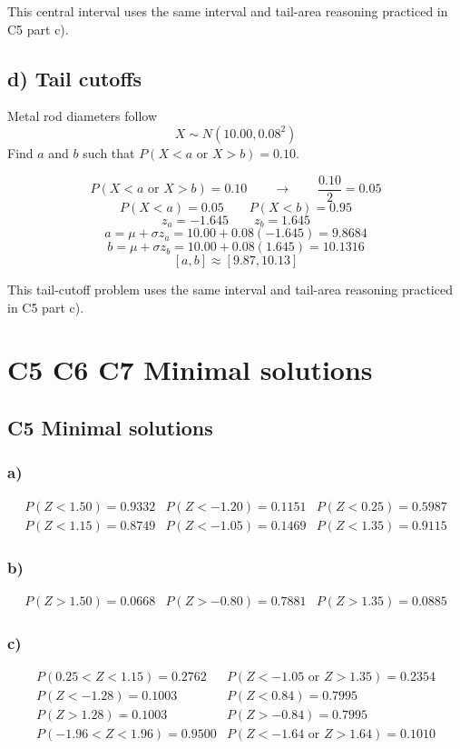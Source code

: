 This central interval uses the same interval and tail-area reasoning practiced in C5 part c).


\subsection*{d) Tail cutoffs}
\label{subsec:inverse-normal-problems-c7-d}
Metal rod diameters follow
\[
X\sim N(10.00,0.08^2)
\]
Find \(a\) and \(b\) such that \(P(X<a\text{ or }X>b)=0.10\).

\[
P(X<a\text{ or }X>b)=0.10
\qquad \longrightarrow \qquad
\frac{0.10}{2}=0.05
\]
\[
P(X<a)=0.05
\qquad
P(X<b)=0.95
\]
\[
z_a=-1.645
\qquad
z_b=1.645
\]
\[
a=\mu+\sigma z_a
=10.00+0.08(-1.645)
=9.8684
\]
\[
b=\mu+\sigma z_b
=10.00+0.08(1.645)
=10.1316
\]
\[
[a,b]\approx[9.87,10.13]
\]

This tail-cutoff problem uses the same interval and tail-area reasoning practiced in C5 part c).



\section{C5 C6 C7 Minimal solutions}

\subsection{C5 Minimal solutions}

\subsubsection*{a)}
\[
\begin{array}{lll}
	P(Z<1.50)=0.9332
	&
	P(Z<-1.20)=0.1151
	&
	P(Z<0.25)=0.5987
	\\[0.2cm]
	P(Z<1.15)=0.8749
	&
	P(Z<-1.05)=0.1469
	&
	P(Z<1.35)=0.9115
\end{array}
\]

\subsubsection*{b)}
\[
\begin{array}{lll}
	P(Z>1.50)=0.0668
	&
	P(Z>-0.80)=0.7881
	&
	P(Z>1.35)=0.0885
\end{array}
\]

\subsubsection*{c)}
\[
\begin{array}{ll}
	P(0.25<Z<1.15)=0.2762
	&
	P(Z<-1.05\text{ or }Z>1.35)=0.2354
	\\[0.2cm]
	P(Z<-1.28)=0.1003
	&
	P(Z<0.84)=0.7995
	\\[0.2cm]
	P(Z>1.28)=0.1003
	&
	P(Z>-0.84)=0.7995
	\\[0.2cm]
	P(-1.96<Z<1.96)=0.9500
	&
	P(Z<-1.64\text{ or }Z>1.64)=0.1010
\end{array}
\]

